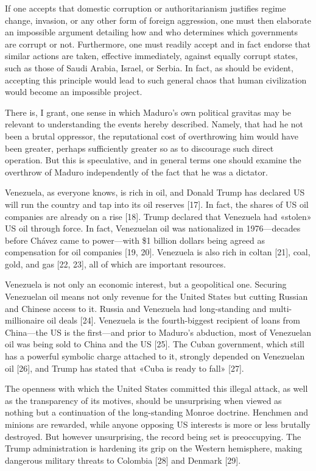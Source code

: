 \documentclass[a4paper, 12pt]{article}
\begin{document}
If one accepts that domestic corruption or authoritarianism justifies regime
change, invasion, or any other form of foreign aggression, one must then
elaborate an impossible argument detailing how and who determines which
governments are corrupt or not. Furthermore, one must readily accept and in fact
endorse that similar actions are taken, effective immediately, against equally
corrupt states, such as those of Saudi Arabia, Israel, or Serbia. In fact, as
should be evident, accepting this principle would lead to such general chaos
that human civilization would become an impossible project.

There is, I grant, one sense in which Maduro's own political gravitas may be
relevant to understanding the events hereby described. Namely, that had he not
been a brutal oppressor, the reputational cost of overthrowing him would have
been greater, perhaps sufficiently greater so as to discourage such direct
operation. But this is speculative, and in general terms one should examine the
overthrow of Maduro independently of the fact that he was a dictator.

Venezuela, as everyone knows, is rich in oil, and Donald Trump has declared US
will run the country and tap into its oil reserves [17]. In fact, the shares of
US oil companies are already on a rise [18]. Trump declared that Venezuela had
«stolen» US oil through force. In fact, Venezuelan oil was nationalized in
1976---decades before Chávez came to power---with \$1 billion dollars being
agreed as compensation for oil companies [19, 20]. Venezuela is also rich in coltan
[21], coal, gold, and gas [22, 23], all of which are important resources. 

Venezuela is not only an economic interest, but a geopolitical one. Securing
Venezuelan oil means not only revenue for the United States but cutting
Russian and Chinese access to it. Russia and Venezuela had long-standing and
multi-millionaire oil deals [24]. Venezuela is the fourth-biggest recipient of
loans from China---the US is the first---and prior to Maduro's abduction, most
of Venezuelan oil was being sold to China and the US [25]. The Cuban government,
which still has a powerful symbolic charge attached to it, strongly depended on
Venezuelan oil [26], and Trump has stated that «Cuba is ready to fall» [27].

The openness with which the United States committed this illegal attack, as well
as the transparency of its motives, should be unsurprising when viewed as
nothing but a continuation of the long-standing Monroe doctrine. Henchmen and
minions are rewarded, while anyone opposing US interests is more or less
brutally destroyed. But however unsurprising, the record being set is
preoccupying. The Trump administration is hardening its grip on the Western
hemisphere, making dangerous military threats to Colombia [28] and Denmark [29].
\end{document}
